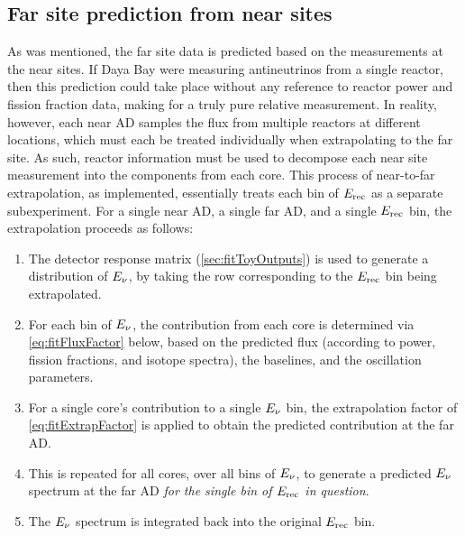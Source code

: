 \documentclass[../thesis.tex]{subfiles}
\begin{document}
\begin{comment}
Compared to the toy Monte Carlo, the LBNL shape fitter is a relatively simple thing.

Its job is just to find the oscillation parameters that best fit the data, i.e. that give the lowest chi2.

It also produces a map of chi2 in parameter space for derivation of contours.
\end{comment}

\subsection{Far site prediction from near sites}
\label{sec:fitNearToFarPred}

As was mentioned, the far site data is predicted based on the measurements at the near sites. If Daya Bay were measuring antineutrinos from a single reactor, then this prediction could take place without any reference to reactor power and fission fraction data, making for a truly pure relative measurement. In reality, however, each near AD samples the flux from multiple reactors at different locations, which must each be treated individually when extrapolating to the far site. As such, reactor information must be used to decompose each near site measurement into the components from each core. This process of near-to-far extrapolation, as implemented, essentially treats each bin of $E_\mathrm{rec}$ as a separate subexperiment. For a single near AD, a single far AD, and a single $E_\mathrm{rec}$ bin, the extrapolation proceeds as follows:

\begin{enumerate}
\item The detector response matrix (\autoref{sec:fitToyOutputs}) is used to generate a distribution of $E_\mathrm{\nu}$, by taking the row corresponding to the $E_\mathrm{rec}$ bin being extrapolated.
\item For each bin of $E_\mathrm{\nu}$, the contribution from each core is determined via \autoref{eq:fitFluxFactor} below, based on the predicted flux (according to power, fission fractions, and isotope spectra), the baselines, and the oscillation parameters.
\item For a single core's contribution to a single $E_\mathrm{\nu}$ bin, the extrapolation factor of \autoref{eq:fitExtrapFactor} is applied to obtain the predicted contribution at the far AD.
\item This is repeated for all cores, over all bins of $E_\mathrm{\nu}$, to generate a predicted $E_\mathrm{\nu}$ spectrum at the far AD \emph{for the single bin of $E_\mathrm{rec}$ in question}.
\item The $E_\mathrm{\nu}$ spectrum is integrated back into the original $E_\mathrm{rec}$ bin.
\end{enumerate}
\end{document}

